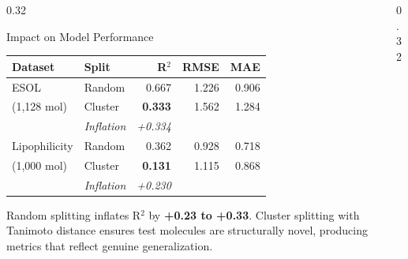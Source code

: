 \documentclass[final]{beamer}
\begin{document}
\begin{frame}[t]
\begin{columns}[T]
\begin{column}{0.32\textwidth}
\begin{block}{Impact on Model Performance}
\vspace{0.3ex}
{\small
\renewcommand{\arraystretch}{1.4}
\begin{tabular}{@{} l l r r r @{}}
\toprule
\textbf{Dataset} & \textbf{Split} & \textbf{R$^2$} & \textbf{RMSE} & \textbf{MAE} \\
\midrule
ESOL & \color{palmred}Random & 0.667 & 1.226 & 0.906 \\
(1,128 mol) & \color{palmgreen}Cluster & \textbf{0.333} & 1.562 & 1.284 \\
& \color{palmgray}\textit{Inflation} & \textit{+0.334} & & \\[0.2ex]
Lipophilicity & \color{palmred}Random & 0.362 & 0.928 & 0.718 \\
(1,000 mol) & \color{palmgreen}Cluster & \textbf{0.131} & 1.115 & 0.868 \\
& \color{palmgray}\textit{Inflation} & \textit{+0.230} & & \\
\bottomrule
\end{tabular}
}

\vspace{0.5ex}
Random splitting inflates R$^2$ by \textbf{+0.23 to +0.33}. Cluster splitting with Tanimoto distance ensures test molecules are structurally novel, producing metrics that reflect genuine generalization.
\end{block}

\end{column}

\begin{column}{0.32\textwidth}


\end{column}
\end{columns}
\end{frame}
\end{document}
